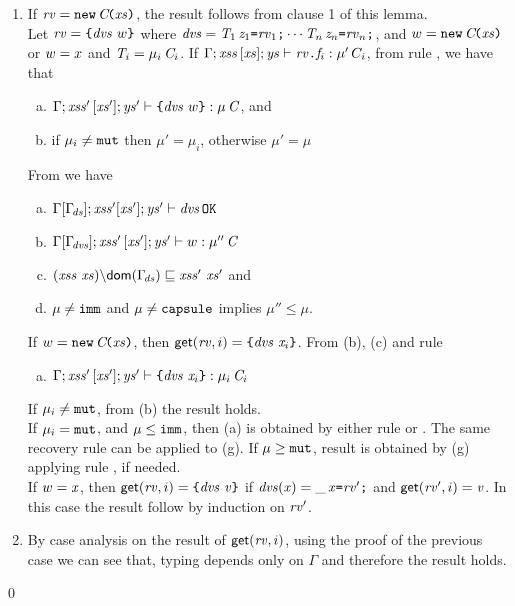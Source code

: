 \begin{enumerate}
 \item If $\mathit{rv}=\texttt{new}\,\mathit{C}\!\texttt{(}\mathit{xs}\texttt{)}$, the result follows from clause 1 of this lemma. \\
 Let $\mathit{rv}=\texttt{\{}\mathit{dvs}\ w\texttt{\}}$ where 
$\mathit{dvs}=\mathit{T}_1\,\mathit{z}_1\texttt{=}\mathit{rv}_1\texttt{;}\cdots\mathit{T}_n\,\mathit{z}_n\texttt{=}\mathit{rv}_n\texttt{;}$, and  
$w=\texttt{new}\,\mathit{C}\!\texttt{(}\mathit{xs}\texttt{)}$ or $w=x$ and $\mathit{T}_i=\mu_i\,\mathit{C}_i$.
If $\Gamma;\mathit{xss}\,[\mathit{xs}];\mathit{ys}\vdash \mathit{rv}\texttt{.}\mathit{f}_i:\mu'\,C_i$,
from rule , we have that 
  \begin{enumerate} [(a)]
\item  $\Gamma;\mathit{xss}'\,[\mathit{xs}'];\mathit{ys}'\vdash \texttt{\{}\mathit{dvs}\ w\texttt{\}}:\mu\,\mathit{C}$, and
\item if $\mu_i\neq\texttt{mut}$ then $\mu'=\mu_i$, otherwise $\mu'=\mu$
\end{enumerate}
From  we have
  \begin{enumerate} [(a)]\addtocounter{enumii}{2}
\item  $\Gamma[\Gamma_{\!\mathit{ds}}];\mathit{xss}'[\mathit{xs}'];\mathit{ys}'\vdash \mathit{dvs}\,{\tt OK}$
\item  ${\Gamma[\Gamma_{\!\mathit{dvs}}]};{\mathit{xss}'}\,[\mathit{xs}'];\mathit{ys}'\vdash w:\mu''\,\mathit{C}$ 
\item $\LessEq{(\LentLocked\ \xs){\setminus}\dom{\TypeEnv{\decs}}}{\LentLocked'\ \xs'}$ and
\item $\mu\not=\texttt{imm}$ and $\mu\not=\texttt{capsule}$ implies $\mu''\leq\mu$. 
\end{enumerate}
If $w=\texttt{new}\,\mathit{C}\!\texttt{(}\mathit{xs}\texttt{)}$, then  $\textsf{get}(\mathit{rv},i)=\texttt{\{}\mathit{dvs}\ \mathit{x}_i\texttt{\}}$.
From (b), (c) and rule 
 \begin{enumerate} [(a)]\addtocounter{enumii}{6}
\item  $\Gamma;\mathit{xss}'\,[\mathit{xs}'];\mathit{ys}'\vdash \texttt{\{}\mathit{dvs}\ \mathit{x}_i\texttt{\}}:\mu_i\,\mathit{C}_i$ 
\end{enumerate}
If \underline{$\mu_i\neq\texttt{mut}$}, from (b) the result holds.\\
If \underline{$\mu_i=\texttt{mut}$}, and $\mu\leq\texttt{imm}$, then (a) is obtained by either rule  or . 
The same recovery rule can be applied to (g). If $\mu\geq\texttt{mut}$, result is obtained by (g) applying rule ,
if needed.\\
If $w=\mathit{x}$, then  $\textsf{get}(\mathit{rv},i)=\texttt{\{}\mathit{dvs}\ \mathit{v}\texttt{\}}$ if $\mathit{dvs}(\mathit{x})=\_\,\mathit{x}\texttt{=}\mathit{rv}'\texttt{;}$ and $\textsf{get}(\mathit{rv}',i)=\mathit{v}$.
In this case the result follow by induction on $\mathit{rv}'$.
\item By case analysis on the result of $\textsf{get}(\mathit{rv},i)$, using the proof of the previous case we can see that, typing depends only on $\Gamma$ and therefore the result holds.
\end{enumerate}
\qed

